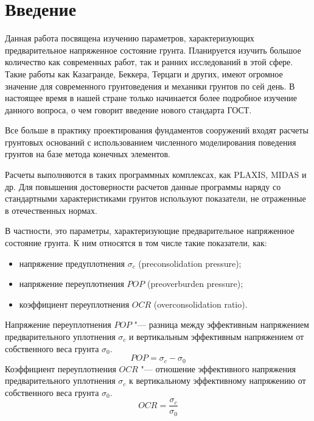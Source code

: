 \chapter*{Введение}                         %

Данная работа посвящена изучению параметров, характеризующих предварительное напряженное состояние грунта. Планируется изучить большое количество как современных работ, так и ранних исследований в этой сфере. Такие работы как Казагранде, Беккера, Терцаги и других, имеют огромное значение для современного грунтоведения и механики грунтов по сей день.
В настоящее время в нашей стране только начинается более подробное изучение данного вопроса, о чем говорит введение нового стандарта ГОСТ. 

Все больше в практику проектирования фундаментов сооружений входят расчеты грунтовых оснований с использованием численного моделирования поведения грунтов на базе метода конечных элементов. 

Расчеты выполняются в таких программных комплексах, как PLAXIS, MIDAS и др. 
Для повышения достоверности расчетов данные программы наряду со стандартными характеристиками грунтов используют показатели, не отраженные в отечественных нормах. 

В частности, это параметры, характеризующие предварительное напряженное состояние грунта. 
К ним относятся в том числе такие показатели, как:
\begin{itemize}
    \item напряжение предуплотнения $\sigma_c$ (preconsolidation pressure);
    \item напряжение переуплотнения $POP$ (preoverburden pressure);
    \item коэффициент переуплотнения $OCR$ (overconsolidation ratio).
\end{itemize}

Напряжение переуплотнения $POP$ "--- разница между эффективным напряжением предвари­тельного уплотнения $\sigma_c$ и вертикальным эффективным напряжением от собственного веса грунта $\sigma_0$.
\begin{equation}
    \label{eq:pop}
    POP = \sigma_c - \sigma_0
\end{equation}
Коэффициент переуплотнения $OCR$ "---  отношение эффективного напряжения предваритель­ного уплотнения $\sigma_c$ к вертикальному эффективному напряжению от собственного веса грунта $\sigma_0$.
\begin{equation}
    \label{eq:ocr}
    OCR = \frac{\sigma_c}{\sigma_0}
\end{equation}

